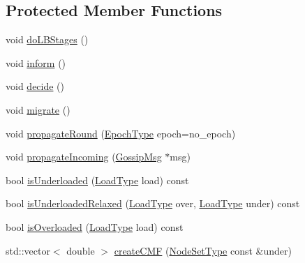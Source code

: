 \subsection*{Protected Member Functions}
\begin{DoxyCompactItemize}
\item 
void \hyperlink{structvt_1_1vrt_1_1collection_1_1lb_1_1_gossip_l_b_af2d00666e6269bb320765b4ca294771d}{do\+L\+B\+Stages} ()
\item 
void \hyperlink{structvt_1_1vrt_1_1collection_1_1lb_1_1_gossip_l_b_afbe0e18095267422ce760573180ac733}{inform} ()
\item 
void \hyperlink{structvt_1_1vrt_1_1collection_1_1lb_1_1_gossip_l_b_a2a990e5bdf182e4705a4ee4082e267a3}{decide} ()
\item 
void \hyperlink{structvt_1_1vrt_1_1collection_1_1lb_1_1_gossip_l_b_ab4ea54ee62ebad9105d79ece61f41b50}{migrate} ()
\item 
void \hyperlink{structvt_1_1vrt_1_1collection_1_1lb_1_1_gossip_l_b_aec4eb4771ea8e0969d8405ae4fb1c309}{propagate\+Round} (\hyperlink{namespacevt_a985a5adf291c34a3ca263b3378388236}{Epoch\+Type} epoch=no\+\_\+epoch)
\item 
void \hyperlink{structvt_1_1vrt_1_1collection_1_1lb_1_1_gossip_l_b_afb935632c8af4efabc3d9a9aa8a5105d}{propagate\+Incoming} (\hyperlink{structvt_1_1vrt_1_1collection_1_1lb_1_1_gossip_l_b_af7170ae946da8af68105109f04824f03}{Gossip\+Msg} $\ast$msg)
\item 
bool \hyperlink{structvt_1_1vrt_1_1collection_1_1lb_1_1_gossip_l_b_a8714236643dcb620aa29956a6ff26b48}{is\+Underloaded} (\hyperlink{structvt_1_1vrt_1_1collection_1_1lb_1_1_base_l_b_a215e22b9f12678303f49615ae3be05cc}{Load\+Type} load) const
\item 
bool \hyperlink{structvt_1_1vrt_1_1collection_1_1lb_1_1_gossip_l_b_a292dbba1aaa750b5c1303570874d5e38}{is\+Underloaded\+Relaxed} (\hyperlink{structvt_1_1vrt_1_1collection_1_1lb_1_1_base_l_b_a215e22b9f12678303f49615ae3be05cc}{Load\+Type} over, \hyperlink{structvt_1_1vrt_1_1collection_1_1lb_1_1_base_l_b_a215e22b9f12678303f49615ae3be05cc}{Load\+Type} under) const
\item 
bool \hyperlink{structvt_1_1vrt_1_1collection_1_1lb_1_1_gossip_l_b_a8bbe18748b6dd4b5269e6abfed5c6f99}{is\+Overloaded} (\hyperlink{structvt_1_1vrt_1_1collection_1_1lb_1_1_base_l_b_a215e22b9f12678303f49615ae3be05cc}{Load\+Type} load) const
\item 
std\+::vector$<$ double $>$ \hyperlink{structvt_1_1vrt_1_1collection_1_1lb_1_1_gossip_l_b_abde7527c3d55e4b9114ace8df4d7c0b9}{create\+C\+MF} (\hyperlink{structvt_1_1vrt_1_1collection_1_1lb_1_1_gossip_l_b_abb53f1d4bd3c37f3e68c3b5b0e1f1c86}{Node\+Set\+Type} const \&under)

\end{DoxyCompactItemize}
